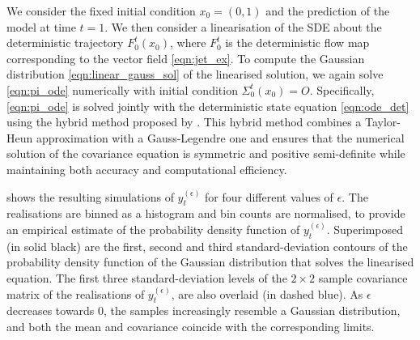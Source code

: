 We consider the fixed initial condition \(x_0 = \left(0, 1\right)\) and the prediction of the model at time \(t = 1\).
We then consider a linearisation of the SDE about the deterministic trajectory \(F_0^t\!\left(x_0\right)\), where \(F_0^t\) is the deterministic flow map corresponding to the vector field \cref{eqn:jet_ex}.
To compute the Gaussian distribution \cref{eqn:linear_gauss_sol} of the linearised solution, we again solve \cref{eqn:pi_ode} numerically with initial condition \(\Sigma_0^t\!\left(x_0\right) = O\).
Specifically, \cref{eqn:pi_ode} is solved jointly with the deterministic state equation \cref{eqn:ode_det} using the hybrid method proposed by \citet{Mazzoni_2008_ComputationalAspectsContinuous}.
This hybrid method combines a Taylor-Heun approximation with a Gauss-Legendre one and ensures that the numerical solution of the covariance equation is symmetric and positive semi-definite while maintaining both accuracy and computational efficiency.


 shows the resulting simulations of \(y_t^{(\epsilon)}\) for four different values of \(\epsilon\).
The realisations are binned as a histogram and bin counts are normalised, to provide an empirical estimate of the probability density function of \(y_t^{(\epsilon)}\).
Superimposed (in solid black) are the first, second and third standard-deviation contours of the probability density function of the Gaussian distribution that solves the linearised equation.
The first three standard-deviation levels of the \(2\times 2\) sample covariance matrix of the realisations of \(y_t^{(\epsilon)}\), are also overlaid (in dashed blue).
As \(\epsilon\) decreases towards \(0\), the samples increasingly resemble a Gaussian distribution, and both the mean and covariance coincide with the corresponding limits.

